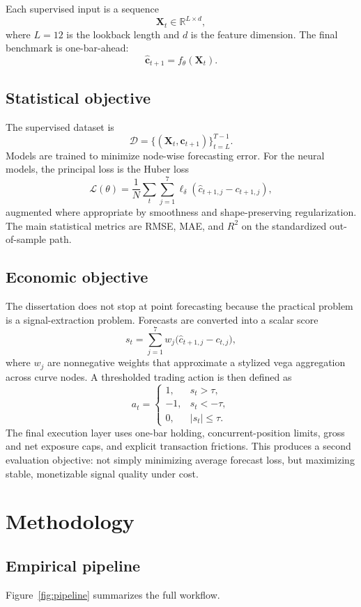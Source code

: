 \documentclass[12pt]{report}
\begin{document}
Each supervised input is a sequence
\[
\mathbf{X}_t \in \mathbb{R}^{L\times d},
\]
where \(L=12\) is the lookback length and \(d\) is the feature dimension. The final benchmark is one-bar-ahead:
\[
\hat{\mathbf{c}}_{t+1}=f_\theta(\mathbf{X}_t).
\]

\section{Statistical objective}
The supervised dataset is
\[
\mathcal{D}=\{(\mathbf{X}_t,\mathbf{c}_{t+1})\}_{t=L}^{T-1}.
\]
Models are trained to minimize node-wise forecasting error. For the neural models, the principal loss is the Huber loss
\[
\mathcal{L}(\theta)=\frac{1}{N}\sum_t\sum_{j=1}^{7}\ell_\delta\!\left(\hat{c}_{t+1,j}-c_{t+1,j}\right),
\]
augmented where appropriate by smoothness and shape-preserving regularization. The main statistical metrics are RMSE, MAE, and \(R^2\) on the standardized out-of-sample path.

\section{Economic objective}
The dissertation does not stop at point forecasting because the practical problem is a signal-extraction problem. Forecasts are converted into a scalar score
\[
s_t=\sum_{j=1}^{7}w_j\big(\hat{c}_{t+1,j}-c_{t,j}\big),
\]
where \(w_j\) are nonnegative weights that approximate a stylized vega aggregation across curve nodes. A thresholded trading action is then defined as
\[
a_t=
\begin{cases}
1, & s_t>\tau,\\
-1, & s_t<-\tau,\\
0, & |s_t|\le \tau.
\end{cases}
\]
The final execution layer uses one-bar holding, concurrent-position limits, gross and net exposure caps, and explicit transaction frictions. This produces a second evaluation objective: not simply minimizing average forecast loss, but maximizing stable, monetizable signal quality under cost.

\chapter{Methodology}

\section{Empirical pipeline}
Figure~\ref{fig:pipeline} summarizes the full workflow.
\end{document}
